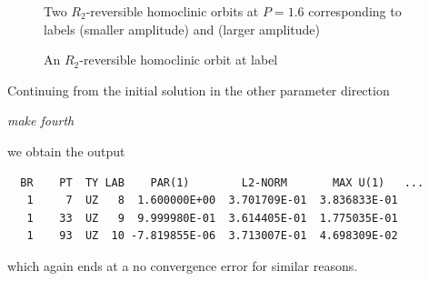 \documentclass[12pt]{report}
\begin{document}
\begin{figure}[p]
\epsfysize 9.0cm
\centerline{}
\caption{Two $R_2$-reversible homoclinic orbits at $P=1.6$ 
corresponding to labels  (smaller amplitude) and  (larger amplitude)}
\label{Frev3}
\end{figure}
\begin{figure}[p]
\epsfysize 9.0cm
\centerline{}
\caption{An $R_2$-reversible homoclinic orbit at label }
\label{Frev4}
\end{figure}

Continuing from the initial solution in the other parameter direction
\begin{center}
\it make fourth
\end{center}
we obtain the output
\begin{verbatim}
  BR    PT  TY LAB    PAR(1)        L2-NORM       MAX U(1)   ...
   1     7  UZ   8  1.600000E+00  3.701709E-01  3.836833E-01  
   1    33  UZ   9  9.999980E-01  3.614405E-01  1.775035E-01  
   1    93  UZ  10 -7.819855E-06  3.713007E-01  4.698309E-02  
\end{verbatim}
which again ends at a no convergence error for similar reasons.




\newpage
\end{document}
